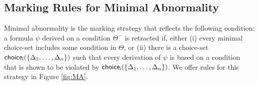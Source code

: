 \documentclass[]{article}
\newcommand{\TurnOne}[2]
    { {#1}\vdash_{\textbf{\sf 1}}  {#2}}
\newcommand{\TurnTwo}[2]
    { {#1}\vdash_{\textbf{\sf 2}}  {#2}}
\newcommand{\TurnThree}[2]
    { {#1}\vdash_{\textbf{\sf 3}}  {#2}}
\newcommand{\TurnFour}[2]
    { {#1}\vdash_{\textbf{\sf 4}}  {#2}}
\newcommand{\TurnFive}[2]
    { {#1}\vdash_{\textbf{\sf 5}}  {#2}}
\newcommand{\TurnSix}[2]
    { {#1}\vdash_{\textbf{\sf 6}}  {#2}}
\newcommand{\TurnMarkedSevenREL}[2]
    { {#1}\vdash_{\textbf{\sf 7\XBox R}}  {#2}}
\newcommand{\TurnMarkedEightREL}[2]
    { {#1}\vdash_{\textbf{\sf 8\XBox R}}  {#2}}
\begin{document}
%
%
%
%

\subsection{Marking Rules for Minimal Abnormality}\label{sec:ma}
%
%
Minimal abnormality is the marking strategy that reflects the following condition: a formula $\psi$ derived on a condition $\Theta^-$ is retracted if, either (i) every minimal choice-set includes some condition in $\Theta$, or (ii) there is a choice-set ${\sf choice_{i}}(\{\Delta_{1},\ldots, \Delta_{n}\})$ such that every derivation of $\psi$ is based on a condition that is shown to be violated by ${\sf choice_{i}}(\{\Delta_{1},\ldots, \Delta_{n}\})$. We offer rules for this strategy in Figure \ref{fig:MA}.
\end{document}
